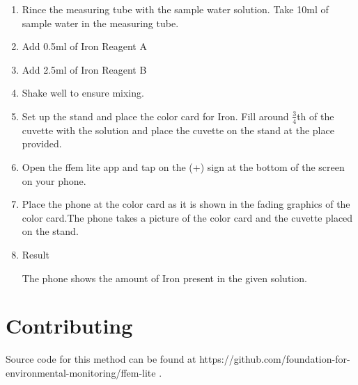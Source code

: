 \documentclass{article}
\begin{document}
 \begin{enumerate}
 \item Rince the measuring tube with the sample water solution. Take 10ml of sample water in the measuring tube.
 \item Add 0.5ml of Iron Reagent A
 \item Add 2.5ml of Iron Reagent B
 \item Shake well to ensure mixing.
 \item Set up the stand and place the color card for Iron. Fill around $\frac{3}{4}$th of the cuvette with  the solution and place the cuvette on the stand at the place provided.
  \item Open the ffem lite app and tap on the (+) sign at the bottom of the screen on your phone.
 \item Place the phone at the color card as it is shown in the fading graphics of the color card.The phone takes a picture of the color card and the cuvette placed on the stand.
 \item Result 
 
 The phone shows the amount of Iron present in the given solution.
 \end{enumerate}
    
\section{Contributing}

Source code for this method can be found at https://github.com/foundation-for-environmental-monitoring/ffem-lite .
\end{document}
